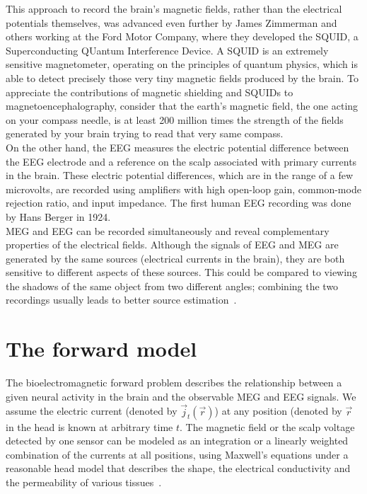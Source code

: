 This approach to record the brain's magnetic fields, rather than the electrical potentials themselves, was advanced even further by James Zimmerman and others working at the Ford Motor Company, where they developed the SQUID, a Superconducting QUantum Interference Device. A SQUID is an extremely sensitive magnetometer, operating on the principles of quantum physics, which is able to detect precisely those very tiny magnetic fields produced by the brain. To appreciate the contributions of magnetic shielding and SQUIDs to magnetoencephalography, consider that the earth's magnetic field, the one acting on your compass needle, is at least 200 million times the strength of the fields generated by your brain trying to read that very same compass.\\

On the other hand, the EEG measures the electric potential difference between the EEG electrode and a reference on the scalp associated with primary currents in the brain. These electric potential differences, which are in the range of a few microvolts, are recorded using amplifiers with high open-loop gain, common-mode rejection ratio, and input impedance. The first human EEG recording was done by Hans Berger in 1924.\\

MEG and EEG can be recorded simultaneously and reveal complementary properties of the electrical fields. Although the signals of EEG and MEG are generated by the same sources (electrical currents in the brain), they are both sensitive to different aspects of these sources. This could be compared to viewing the shadows of the same object from two different angles; combining the two recordings usually leads to better source estimation~\cite{malmivuo2012comparison,sharon2007advantage,aydin2015combined}.

\section{The forward model}
The bioelectromagnetic forward problem describes the relationship between a given neural activity in the brain and the observable MEG and EEG signals. We assume the electric current (denoted by $\vec{j}_t(\vec{r})$) at any position (denoted by $\vec{r}$ in the head is known at arbitrary time $t$. The magnetic field or the scalp voltage detected by one sensor can be modeled as an integration or a linearly weighted combination of the currents at all positions, using Maxwell's equations under a reasonable head model that describes the shape, the electrical conductivity and the permeability of various tissues~\cite{hamalainen1993magnetoencephalography,mosher1999eeg}.

